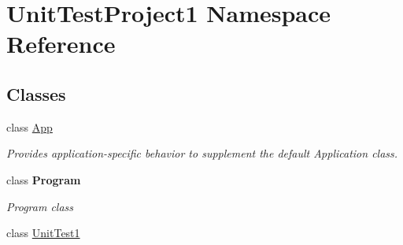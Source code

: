 \hypertarget{namespace_unit_test_project1}{}\section{Unit\+Test\+Project1 Namespace Reference}
\label{namespace_unit_test_project1}
\subsection*{Classes}
\begin{DoxyCompactItemize}
\item 
class \mbox{\hyperlink{class_unit_test_project1_1_1_app}{App}}
\begin{DoxyCompactList}\small\item\em Provides application-\/specific behavior to supplement the default Application class. \end{DoxyCompactList}\item 
class {\bfseries Program}
\begin{DoxyCompactList}\small\item\em Program class \end{DoxyCompactList}\item 
class \mbox{\hyperlink{class_unit_test_project1_1_1_unit_test1}{Unit\+Test1}}
\end{DoxyCompactItemize}

